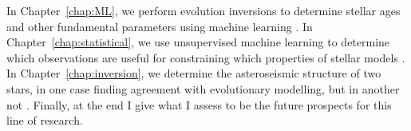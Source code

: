 In Chapter~\ref{chap:ML}, we perform evolution inversions to determine stellar ages and other fundamental parameters using machine learning \citep{2016apj...830...31b}. 
In Chapter~\ref{chap:statistical}, we use unsupervised machine learning to determine which observations are useful for constraining which properties of stellar models \citep{2017apj...839..116a}. 
In Chapter~\ref{chap:inversion}, we determine the asteroseismic structure of two stars, in one case finding agreement with evolutionary modelling, but in another not \citep{2017ApJ...851...80B}. 
Finally, at the end I give what I assess to be the future prospects for this line of research. 

















